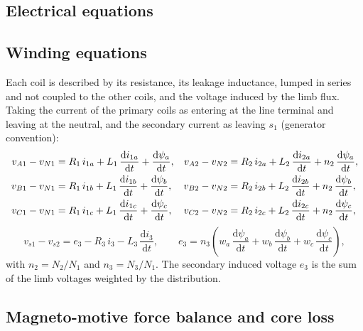 \documentclass[10pt,a4paper]{scrartcl}
\newcommand{\tder}[1]{\frac{\mathrm{d}#1}{\mathrm{d}t}}
\begin{document}
\begin{onehalfspace}
\section{Electrical equations}

\subsection{Winding equations}

Each coil is described by its resistance, its leakage inductance, lumped in series and not coupled to the other coils, and the voltage induced by the limb flux. Taking the current of the primary coils as entering at the line terminal and leaving at the neutral, and the secondary current as leaving $s_1$ (generator convention):
\begin{align}
v_{A1} - v_{N1} &= R_1\, i_{1a} + L_1\,\tder{i_{1a}} + \tder{\psi_a}, &
v_{A2} - v_{N2} &= R_2\, i_{2a} + L_2\,\tder{i_{2a}} + n_2\,\tder{\psi_a}, \notag\\
v_{B1} - v_{N1} &= R_1\, i_{1b} + L_1\,\tder{i_{1b}} + \tder{\psi_b}, &
v_{B2} - v_{N2} &= R_2\, i_{2b} + L_2\,\tder{i_{2b}} + n_2\,\tder{\psi_b}, \label{eq:prim}\\
v_{C1} - v_{N1} &= R_1\, i_{1c} + L_1\,\tder{i_{1c}} + \tder{\psi_c}, &
v_{C2} - v_{N2} &= R_2\, i_{2c} + L_2\,\tder{i_{2c}} + n_2\,\tder{\psi_c}, \notag
\end{align}
\begin{equation}
v_{s1} - v_{s2} = e_3 - R_3\, i_3 - L_3\,\tder{i_3}, \qquad
e_3 = n_3\left(w_a\,\tder{\psi_a} + w_b\,\tder{\psi_b} + w_c\,\tder{\psi_c}\right),
\label{eq:sec}
\end{equation}
with $n_2 = N_2/N_1$ and $n_3 = N_3/N_1$. The secondary induced voltage $e_3$ is the sum of the limb voltages weighted by the distribution.

\subsection{Magneto-motive force balance and core loss}


\end{onehalfspace}
\end{document}
